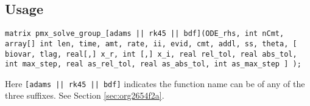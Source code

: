 \documentclass[12pt, reqno, oneside]{amsbook}
\numberwithin{equation}{chapter}
\numberwithin{figure}{chapter}
\numberwithin{table}{chapter}
\theoremstyle{remark}
\begin{document}
\subsection{Usage}
\label{sec:orgca1a777}
\begin{verbatim}
matrix pmx_solve_group_[adams || rk45 || bdf](ODE_rhs, int nCmt, array[] int len, time, amt, rate, ii, evid, cmt, addl, ss, theta, [ biovar, tlag, real[,] x_r, int [,] x_i, real rel_tol, real abs_tol, int max_step, real as_rel_tol, real as_abs_tol, int as_max_step ] );
\end{verbatim}
Here \texttt{[adams || rk45 || bdf]} indicates the
function name can be of any of the three suffixes. See Section \ref{sec:org2654f2a}.
\end{document}
